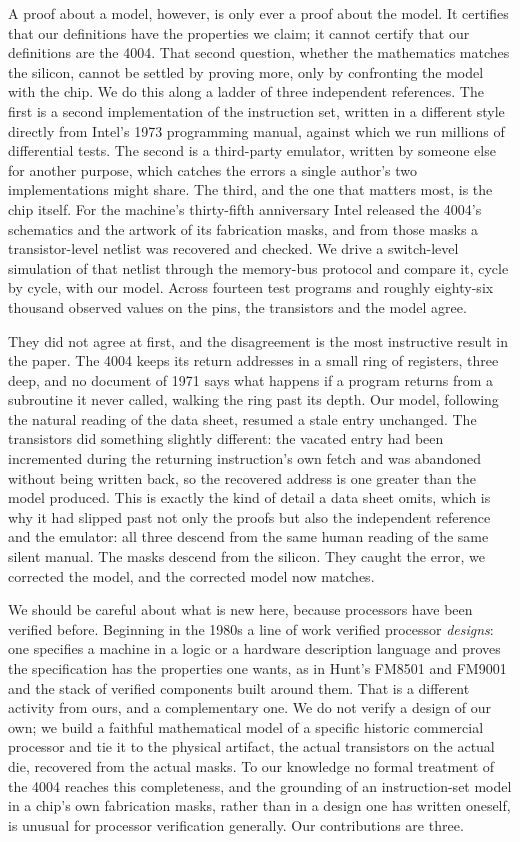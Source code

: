\documentclass[11pt]{amsart}
\theoremstyle{plain}
\theoremstyle{definition}
\begin{document}
A proof about a model, however, is only ever a proof about the model. It certifies that our definitions have the properties we claim; it cannot certify that our definitions are the 4004. That second question, whether the mathematics matches the silicon, cannot be settled by proving more, only by confronting the model with the chip. We do this along a ladder of three independent references. The first is a second implementation of the instruction set, written in a different style directly from Intel's 1973 programming manual, against which we run millions of differential tests. The second is a third-party emulator, written by someone else for another purpose, which catches the errors a single author's two implementations might share. The third, and the one that matters most, is the chip itself. For the machine's thirty-fifth anniversary Intel released the 4004's schematics and the artwork of its fabrication masks, and from those masks a transistor-level netlist was recovered and checked. We drive a switch-level simulation of that netlist through the memory-bus protocol and compare it, cycle by cycle, with our model. Across fourteen test programs and roughly eighty-six thousand observed values on the pins, the transistors and the model agree.

They did not agree at first, and the disagreement is the most instructive result in the paper. The 4004 keeps its return addresses in a small ring of registers, three deep, and no document of 1971 says what happens if a program returns from a subroutine it never called, walking the ring past its depth. Our model, following the natural reading of the data sheet, resumed a stale entry unchanged. The transistors did something slightly different: the vacated entry had been incremented during the returning instruction's own fetch and was abandoned without being written back, so the recovered address is one greater than the model produced. This is exactly the kind of detail a data sheet omits, which is why it had slipped past not only the proofs but also the independent reference and the emulator: all three descend from the same human reading of the same silent manual. The masks descend from the silicon. They caught the error, we corrected the model, and the corrected model now matches.

We should be careful about what is new here, because processors have been verified before. Beginning in the 1980s a line of work verified processor \emph{designs}: one specifies a machine in a logic or a hardware description language and proves the specification has the properties one wants, as in Hunt's FM8501 and FM9001 \cite{hunt} and the stack of verified components built around them. That is a different activity from ours, and a complementary one. We do not verify a design of our own; we build a faithful mathematical model of a specific historic commercial processor and tie it to the physical artifact, the actual transistors on the actual die, recovered from the actual masks. To our knowledge no formal treatment of the 4004 reaches this completeness, and the grounding of an instruction-set model in a chip's own fabrication masks, rather than in a design one has written oneself, is unusual for processor verification generally. Our contributions are three.
\end{document}
